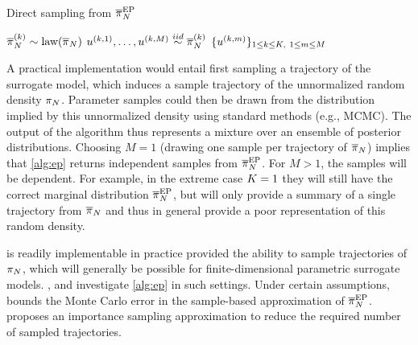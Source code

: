 \documentclass[12pt]{article}
\begin{document}
\begin{algorithm}
    \caption{Direct sampling from $\llikEmSampDensNorm$}
    \label{alg:ep}
    \begin{algorithmic}[1] %
        		\State $\llikEmRdm[\Ndesign]{\postDensNorm}^{(\sampleIndex)} \sim \law(\llikEmRdm[\Ndesign]{\postDensNorm})$ 
		\State $\Par^{(\sampleIndex, 1)}, \dots, \Par^{(\sampleIndex, M)} \overset{iid}{\sim} \llikEmRdm[\Ndesign]{\postDensNorm}^{(\sampleIndex)}$ 
	\EndFor
	\State \Return $\{\Par^{(\sampleIndex, m)}\}_{1 \leq \sampleIndex \leq \NSample, \ 1 \leq m \leq M}$
	\EndFunction
    \end{algorithmic}
\end{algorithm}

A practical implementation 
would entail first sampling a trajectory of the surrogate model, which induces a sample 
trajectory of the unnormalized random density $\llikEmRdmDens[\Ndesign]$. Parameter samples
could then be drawn from the distribution implied by this unnormalized density using standard 
methods (e.g., MCMC).
The output of the algorithm thus represents a mixture over an 
ensemble of posterior distributions. Choosing $M = 1$  (drawing one sample per
trajectory of $\postNormEm[\Ndesign]$) implies that \cref{alg:ep} returns independent 
samples from $\postApproxEP[\Ndesign]$. For $M > 1$, the samples will be dependent.
For example, in the extreme case $\NSample = 1$ they will 
still have the correct marginal distribution $\postApproxEP[\Ndesign]$, but will 
only provide a summary of a single trajectory from $\postNormEm[\Ndesign]$ and thus 
in general provide a poor representation of this random density.

 is readily implementable in practice provided the ability to sample trajectories 
of $\postEm[\Ndesign]$, which will generally be possible for finite-dimensional 
parametric surrogate models. \citet{garegnani2021NoisyMCMC,BurknerSurrogate}, and \citet{BurknerTwoStep}
investigate \cref{alg:ep} in such settings. Under certain assumptions, \citet{garegnani2021NoisyMCMC} 
bounds the Monte Carlo error in the sample-based approximation of $\postApproxEP[\Ndesign]$.
\citet{BurknerTwoStep} proposes an importance sampling approximation to reduce the 
required number of sampled trajectories.
\end{document}
